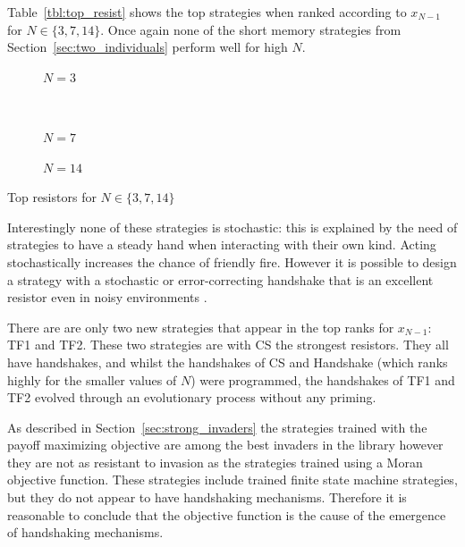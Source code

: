 \documentclass{article}
\begin{document}
Table~\ref{tbl:top_resist} shows the top strategies when ranked
according to \(x_{N-1}\) for \(N\in\{3, 7, 14\}\).
Once again none of the short memory strategies from
Section~\ref{sec:two_individuals} perform well for high \(N\).

\begin{table}[!hbtp]
    \scriptsize
    \centering
    \begin{subfigure}[t]{.5\textwidth}
        \centering
        
        \caption{\(N=3\)}
    \end{subfigure}%
    ~
    \begin{subfigure}[t]{.5\textwidth}
        \centering
        
        \caption{\(N=7\)}
    \end{subfigure}

    \begin{subfigure}[t]{.3\textwidth}
        \centering
        
        \caption{\(N=14\)}
    \end{subfigure}
    \caption{Top resistors for \(N\in\{3, 7, 14\}\)}
    \label{tbl:top_resist}
\end{table}

Interestingly none of these strategies is stochastic: this is explained by
the need of strategies to have a steady hand when interacting with their own
kind. Acting stochastically increases the chance of friendly fire.
However it is possible to design a strategy with a stochastic or error-correcting
handshake that is an excellent resistor even in noisy environments \cite{Lee2015}.

There are are only two new strategies that appear in the top ranks for
\(x_{N-1}\): TF1 and TF2. These two strategies are with CS the strongest
resistors. They all have handshakes, and whilst the handshakes of CS and
Handshake (which ranks highly for the smaller values of \(N\)) were
programmed, the handshakes of TF1 and TF2 evolved through an evolutionary
process without any priming.

As described in Section~\ref{sec:strong_invaders} the strategies trained with
the payoff maximizing objective are among the best invaders in the library
however they are not as resistant to invasion as the strategies trained using a
Moran objective function. These strategies include trained finite state machine
strategies, but they do not appear to have handshaking mechanisms. Therefore it
is reasonable to conclude that the objective function is the cause of the
emergence of handshaking mechanisms.
\end{document}
